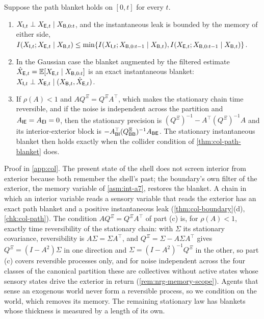 \begin{proposition}\label{prop:col-memory}
Suppose the path blanket holds on $[0,t]$ for every $t$.
\begin{enumerate}
\item[(a)] $X_{\mathsf{I},t}\perp X_{\mathsf{E},t}\mid X_{\mathsf{B},0:t}$, and the instantaneous leak is bounded by the memory of either side, $I(X_{\mathsf{I},t};X_{\mathsf{E},t}\mid X_{\mathsf{B},t})\le\min\{I(X_{\mathsf{I},t};X_{\mathsf{B},0:t-1}\mid X_{\mathsf{B},t}),I(X_{\mathsf{E},t};X_{\mathsf{B},0:t-1}\mid X_{\mathsf{B},t})\}$.
\item[(b)] In the Gaussian case the blanket augmented by the filtered estimate $\hat X_{\mathsf{E},t}=\mathbb{E}[X_{\mathsf{E},t}\mid X_{\mathsf{B},0:t}]$ is an exact instantaneous blanket: $X_{\mathsf{I},t}\perp X_{\mathsf{E},t}\mid(X_{\mathsf{B},t},\hat X_{\mathsf{E},t})$.
\item[(c)] If $\rho(A)<1$ and $AQ^{\Xi}=Q^{\Xi}A^\top$, which makes the stationary chain time reversible, and if the noise is independent across the partition and $A_{\mathsf{I}\mathsf{E}}=A_{\mathsf{E}\mathsf{I}}=0$, then the stationary precision is $(Q^{\Xi})^{-1}-A^\top(Q^{\Xi})^{-1}A$ and its interior-exterior block is $-A_{\mathsf{B}\mathsf{I}}^\top(Q^{\Xi}_{\mathsf{B}\mathsf{B}})^{-1}A_{\mathsf{B}\mathsf{E}}$. The stationary instantaneous blanket then holds exactly when the collider condition of \cref{thm:col-path-blanket} does.
\end{enumerate}
\end{proposition}
Proof in \cref{app:col}. The present state of the shell does not screen interior from exterior because both remember the shell's past; the boundary's own filter of the exterior, the memory variable of \cref{asm:int-a7}, restores the blanket. A chain in which an interior variable reads a sensory variable that reads the exterior has an exact path blanket and a positive instantaneous leak (\cref{thm:col-boundary}(d), \cref{chk:col-path}). The condition $AQ^{\Xi}=Q^{\Xi}A^\top$ of part (c) is, for $\rho(A)<1$, exactly time reversibility of the stationary chain: with $\Sigma$ its stationary covariance, reversibility is $A\Sigma=\Sigma A^\top$, and $Q^{\Xi}=\Sigma-A\Sigma A^\top$ gives $Q^{\Xi}=(I-A^2)\Sigma$ in one direction and $\Sigma=(I-A^2)^{-1}Q^{\Xi}$ in the other, so part (c) covers reversible processes only, and for noise independent across the four classes of the canonical partition these are collectives without active states whose sensory states drive the exterior in return (\cref{rem:nrg-memory-scope}). Agents that sense an exogenous world never form a reversible process, so we condition on the world, which removes its memory. The remaining stationary law has blankets whose thickness is measured by a length of its own.

